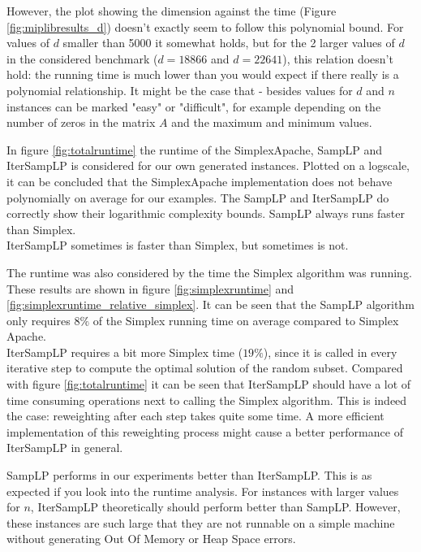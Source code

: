\documentclass[nocopyrightspace]{acm_proc_article-sp}
\begin{document}
However, the plot showing the dimension against the time (Figure \ref{fig:miplibresults_d}) doesn't exactly seem to follow this polynomial bound. For values of $d$ smaller than 5000 it somewhat holds, but for the 2 larger values of $d$ in the considered benchmark ($d=18866$ and $d=22641$), this relation doesn't hold: the running time is much lower than you would expect if there really is a polynomial relationship. It might be the case that - besides values for $d$ and $n$ instances can be marked "easy" or "difficult", for example depending on the number of zeros in the matrix $A$ and the maximum and minimum values.

In figure \ref{fig:totalruntime} the runtime of the SimplexApache, SampLP and IterSampLP is considered for our own generated instances. Plotted on a logscale, it can be concluded that the SimplexApache implementation does not behave polynomially on average for our examples. The SampLP and IterSampLP do correctly show their logarithmic complexity bounds. SampLP always runs faster than Simplex. \\ IterSampLP sometimes is faster than Simplex, but sometimes is not. 

The runtime was also considered by the time the Simplex algorithm was running. These results are shown in figure \ref{fig:simplexruntime} and \ref{fig:simplexruntime_relative_simplex}. It can be seen that the SampLP algorithm only requires $8\%$ of the Simplex running time on average compared to Simplex Apache. \\ IterSampLP requires a bit more Simplex time ($19\%$), since it is called in every iterative step to compute the optimal solution of the random subset. Compared with figure \ref{fig:totalruntime} it can be seen that IterSampLP should have a lot of time consuming operations next to calling the Simplex algorithm. This is indeed the case: reweighting after each step takes quite some time. A more efficient implementation of this reweighting process might cause a better performance of IterSampLP in general. 

SampLP performs in our experiments better than IterSampLP. This is as expected if you look into the runtime analysis. For instances with larger values for $n$, IterSampLP theoretically should perform better than SampLP. However, these instances are such large that they are not runnable on a simple machine without generating Out Of Memory or Heap Space errors.
\end{document}
